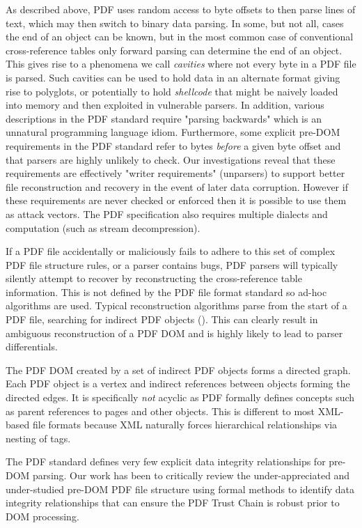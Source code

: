 As described above, PDF uses random access to byte offsets to then parse lines of text,
which may then switch to binary data parsing. 
In some, but not all, cases the end of an object can be known, but in the most common case 
of conventional cross-reference tables only forward parsing can determine the end of an object. 
This gives rise to a phenomena we call \emph{cavities} where not every byte in a PDF file is parsed.
Such cavities can be used to hold data in an alternate format giving rise to polyglots, or potentially
to hold \emph{shellcode} that might be naively loaded into memory and then exploited 
in vulnerable parsers.
In addition, various descriptions in the PDF standard require "parsing backwards" which is 
an unnatural programming language idiom. Furthermore, some explicit pre-DOM requirements
in the PDF standard
refer to bytes \emph{before} a given byte offset and that parsers are highly unlikely to check. 
Our investigations reveal that these requirements are effectively "writer requirements" (unparsers) to
support better file reconstruction and recovery in the event of later data corruption. 
However if these requirements are never checked or enforced then it is possible to use them as attack
vectors.  
The PDF specification also requires multiple
dialects and computation (such as stream decompression).

If a PDF file accidentally or maliciously fails to adhere to this set of complex PDF file structure
rules, or a parser contains bugs, PDF parsers will typically silently attempt to recover
by reconstructing the cross-reference table information. 
This is not defined by the PDF file format standard so 
ad-hoc algorithms are used. Typical reconstruction algorithms parse from the start of a PDF 
file, searching for indirect PDF objects (). This can clearly result
in ambiguous reconstruction of a PDF DOM and is highly likely to lead to parser differentials.

The PDF DOM created by a set of indirect PDF objects forms a directed graph. 
Each PDF object is a vertex and indirect references between objects forming the directed edges. It is 
specifically \emph{not} acyclic as PDF formally defines concepts such as parent references to 
pages and other objects. This is different to most XML-based file formats because XML naturally 
forces hierarchical relationships via nesting of tags.

The PDF standard defines very few explicit data integrity relationships for pre-DOM parsing. 
Our work has been to critically review the under-appreciated and under-studied pre-DOM PDF
file structure using formal methods to identify data integrity relationships that can 
ensure the PDF Trust Chain is robust prior to DOM processing.

